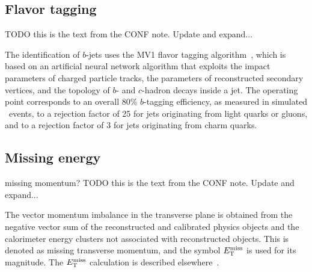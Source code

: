 \subsection{Flavor tagging} 
\label{sec:flavor_tagging}

{\color{red} TODO this is the text from the CONF note. Update and expand...}

The identification of $b$-jets uses the MV1 flavor tagging
algorithm~\cite{ATLAS-CONF-2014-004, ATLAS-CONF-2014-046}, which is
based on an artificial neural network
algorithm that exploits the impact parameters of charged particle
tracks, the parameters of reconstructed secondary vertices, and the
topology of $b$- and $c$-hadron decays inside a jet.  The operating
point corresponds to an overall 80\% $b$-tagging efficiency, as
measured in simulated \TTBAR\ events, to a rejection factor of 25 for jets
originating from light quarks or gluons, and to a rejection factor of
3 for jets originating from charm quarks.

\subsection{Missing energy} 
\label{sec:met}

{\color{red} missing momentum?}
{\color{red} TODO this is the text from the CONF note. Update and expand...}

The vector momentum imbalance in the transverse plane is obtained from
the negative vector sum of the reconstructed and calibrated physics
objects and the calorimeter energy clusters not associated with reconstructed
objects. This is denoted as missing transverse momentum, and the symbol
$E_{\mathrm{T}}^{\mathrm{miss}}$ is used for its magnitude.  The $E_{\mathrm{T}}^{\mathrm{miss}}$ calculation is described
elsewhere~\cite{ATLAS-CONF-2013-082}.
